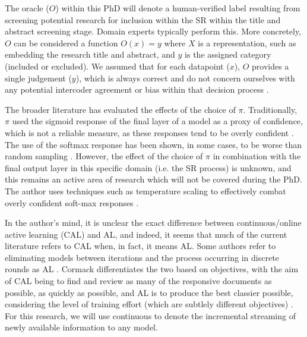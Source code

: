 \documentclass[../main.tex]{subfiles}
\begin{document}
The oracle ($O$) within this PhD will denote a human-verified label resulting from screening potential research for inclusion within the SR within the title and abstract screening stage. Domain experts typically perform this. More concretely, $O$ can be considered a function $O(x) = y$ where $X$ is a representation, such as embedding the research title and abstract, and $y$ is the assigned category (included or excluded). We assumed that for each datapoint ($x$), $O$ provides a single judgement ($y$), which is always correct and do not concern ourselves with any potential intercoder agreement or bias within that decision process \cite{artstein_survey_2008}.

The broader literature has evaluated the effects of the choice of $\pi$. Traditionally, $\pi$ used the sigmoid response of the final layer of a model as a proxy of confidence, which is not a reliable measure, as these responses tend to be overly confident \cite{pearce_understanding_2021}. The use of the softmax response has been shown, in some cases, to be worse than random sampling \cite{wang_new_2014}. However, the effect of the choice of $\pi$ in combination with the final output layer in this specific domain (i.e. the SR process) is unknown, and this remains an active area of research which will not be covered during the PhD. The author uses techniques such as temperature scaling to effectively combat overly confident soft-max responses \cite{guo_calibration_2017}.



In the author's mind, it is unclear the exact difference between continuous/online active learning (CAL) and AL, and indeed, it seems that much of the current literature refers to CAL when, in fact, it means AL. Some authors refer to eliminating models between iterations and the process occurring in discrete rounds as AL \cite{settles_active_2009}. Cormack differentiates the two based on objectives, with the aim of CAL being to find and review as many of the responsive documents as possible, as quickly as possible, and AL is to produce the best classier possible, considering the level of training effort (which are subtlely different objectives) \cite{cormack_autonomy_2015}. For this research, we will use continuous to denote the incremental streaming of newly available information to any model. 
\end{document}
